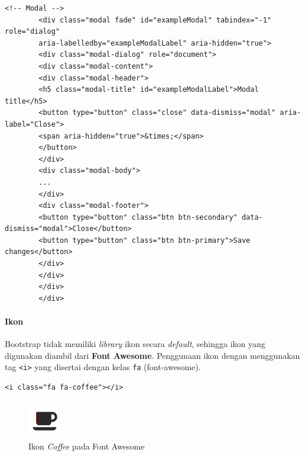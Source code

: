 \documentclass[a4paper,twoside]{article}
\begin{document}
\begin{enumerate}
\begin{lstlisting}[frame=single, basicstyle=\tiny]
		<!-- Modal -->
		<div class="modal fade" id="exampleModal" tabindex="-1" role="dialog" 
		aria-labelledby="exampleModalLabel" aria-hidden="true">
		<div class="modal-dialog" role="document">
		<div class="modal-content">
		<div class="modal-header">
		<h5 class="modal-title" id="exampleModalLabel">Modal title</h5>
		<button type="button" class="close" data-dismiss="modal" aria-label="Close">
		<span aria-hidden="true">&times;</span>
		</button>
		</div>
		<div class="modal-body">
		...
		</div>
		<div class="modal-footer">
		<button type="button" class="btn btn-secondary" data-dismiss="modal">Close</button>
		<button type="button" class="btn btn-primary">Save changes</button>
		</div>
		</div>
		</div>
		</div>
		\end{lstlisting}
		
		\paragraph{Ikon} \par
		Bootstrap tidak memiliki \textit{library} ikon secara \textit{default}, sehingga ikon yang digunakan diambil dari \textbf{Font Awesome}. Penggunaan ikon dengan menggunakan tag \texttt{<i>} yang disertai dengan kelas \texttt{fa} (font-awesome). 
		
		\begin{lstlisting}[frame=single]
		<i class="fa fa-coffee"></i>
		\end{lstlisting}
		
		\begin{figure} [H]
			\centering  
			\includegraphics[scale=1.0]{fa_coffee.PNG}  
			\caption{Ikon \textit{Coffee} pada Font Awesome} 
		\end{figure}

\end{enumerate}
\end{document}
